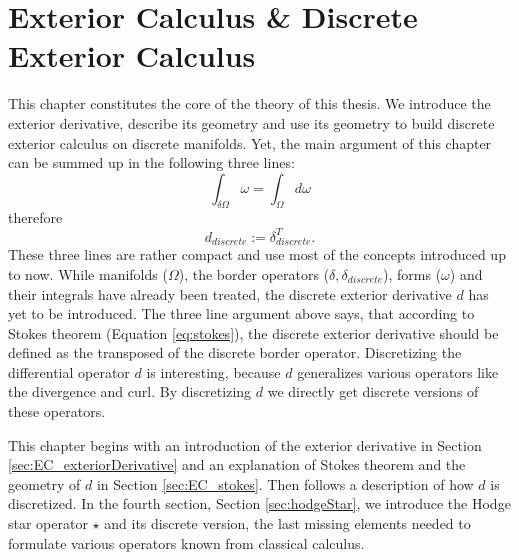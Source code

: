 \chapter{Exterior Calculus \& Discrete Exterior Calculus}
\label{chap:EC}

This chapter constitutes the core of the theory of this thesis. We introduce the exterior derivative, describe its geometry and use its geometry to build discrete exterior calculus on discrete manifolds. Yet, the main argument of this chapter can be summed up in the following three lines:
\begin{equation} \int_{\delta \Omega} \omega = \int_{\Omega} d \omega \label{eq:stokes}\end{equation}
therefore
\[d_{discrete} := \delta_{discrete}^T.\]
These three lines are rather compact and use most of the concepts introduced up to now. While manifolds ($\Omega$), the border operators ($\delta, \delta_{discrete}$), forms ($\omega$) and their integrals have already been treated, the discrete exterior derivative $d$ has yet to be introduced. The three line argument above says, that according to Stokes theorem (Equation \ref{eq:stokes}), the discrete exterior derivative should be defined as the transposed of the discrete border operator. 
Discretizing the differential operator $d$ is interesting, because $d$ generalizes various operators like the divergence and curl. By discretizing $d$ we directly get discrete versions of these operators. 

This chapter begins with an introduction of the exterior derivative in Section \ref{sec:EC_exteriorDerivative} and an explanation of Stokes theorem and the geometry of $d$ in Section \ref{sec:EC_stokes}. Then follows a description of
how $d$ is discretized. In the fourth section, Section \ref{sec:hodgeStar}, we introduce the Hodge star operator $\star$ and its discrete version, the last missing elements needed to formulate various operators known from classical calculus.

